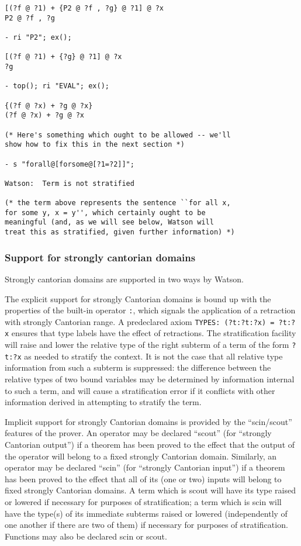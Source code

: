 \documentclass{kluwer}
\begin{document}
\begin{article}
\begin{verbatim}
[(?f @ ?1) + {P2 @ ?f , ?g} @ ?1] @ ?x
P2 @ ?f , ?g

- ri "P2"; ex();

[(?f @ ?1) + {?g} @ ?1] @ ?x
?g

- top(); ri "EVAL"; ex();

{(?f @ ?x) + ?g @ ?x}
(?f @ ?x) + ?g @ ?x

(* Here's something which ought to be allowed -- we'll
show how to fix this in the next section *)

- s "forall@[forsome@[?1=?2]]";

Watson:  Term is not stratified

(* the term above represents the sentence ``for all x, 
for some y, x = y'', which certainly ought to be 
meaningful (and, as we will see below, Watson will 
treat this as stratified, given further information) *)
\end{verbatim}

\subsubsection{ Support for strongly cantorian domains }

Strongly cantorian domains are supported in two ways by Watson.

The explicit support for strongly Cantorian domains is bound up with
the properties of the built-in operator {\tt :}, which signals the
application of a retraction with strongly Cantorian range.  A
predeclared axiom {\tt TYPES: (?t:?t:?x) = ?t:?x} ensures that type
labels have the effect of retractions.  The stratification facility
will raise and lower the relative type of the right subterm of a term
of the form {\tt ?t:?x} as needed to stratify the context.  It is not the
case that all relative type information from such a subterm is
suppressed: the difference between the relative types of two bound
variables may be determined by information internal to such a term,
and will cause a stratification error if it conflicts with other
information derived in attempting to stratify the term.

Implicit support for strongly Cantorian domains is provided by the
``scin/scout'' features of the prover.  An operator may be declared
``scout'' (for ``strongly Cantorian output'') if a theorem has been
proved to the effect that the output of the operator will belong to a
fixed strongly Cantorian domain.  Similarly, an operator may be
declared ``scin'' (for ``strongly Cantorian input'') if a theorem has
been proved to the effect that all of its (one or two) inputs will
belong to fixed strongly Cantorian domains.  A term which is scout
will have its type raised or lowered if necessary for purposes of
stratification; a term which is scin will have the type(s) of its
immediate subterms raised or lowered (independently of one another if
there are two of them) if necessary for purposes of stratification.
Functions may also be declared scin or scout.


\end{article}
\end{document}
